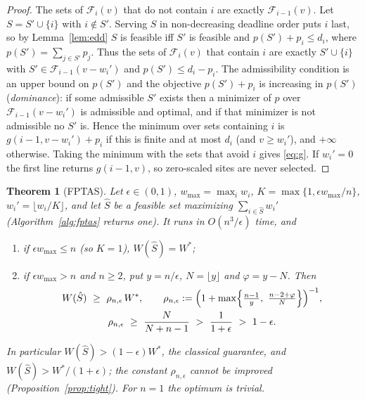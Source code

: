 \documentclass[pdflatex,sn-mathphys-ay]{sn-jnl}
\theoremstyle{thmstyleone}
\newtheorem{theorem}{Theorem}
\theoremstyle{thmstyletwo}
\theoremstyle{thmstylethree}
\begin{document}
\begin{proof}
The sets of $\mathcal F_i(v)$ that do not contain $i$ are exactly
$\mathcal F_{i-1}(v)$. Let $S=S'\cup\{i\}$ with $i\notin S'$. Serving $S$
in non-decreasing deadline order puts $i$ last, so by
Lemma~\ref{lem:edd} $S$ is feasible iff $S'$ is feasible and
$p(S')+p_i\le d_i$, where $p(S')=\sum_{j\in S'}p_j$. Thus the sets of
$\mathcal F_i(v)$ that contain $i$ are exactly $S'\cup\{i\}$ with
$S'\in\mathcal F_{i-1}(v-w_i')$ and $p(S')\le d_i-p_i$. The admissibility
condition is an upper bound on $p(S')$ and the objective $p(S')+p_i$ is
increasing in $p(S')$ (\emph{dominance}): if some admissible $S'$ exists
then a minimizer of $p$ over $\mathcal F_{i-1}(v-w_i')$ is admissible and
optimal, and if that minimizer is not admissible no $S'$ is. Hence the
minimum over sets containing $i$ is $g(i-1,v-w_i')+p_i$ if this is finite
and at most $d_i$ (and $v\ge w_i'$), and $+\infty$ otherwise. Taking the
minimum with the sets that avoid $i$ gives \eqref{eq:g}. If $w_i'=0$ the
first line returns $g(i-1,v)$, so zero-scaled sites are never selected.
\end{proof}

\begin{theorem}[FPTAS]\label{thm:fptas}
Let $\epsilon\in(0,1)$, $w_{\max}=\max_iw_i$, $K=\max\{1,\epsilon
w_{\max}/n\}$, $w_i'=\lfloor w_i/K\rfloor$, and let $\hat S$ be a feasible
set maximizing $\sum_{i\in\hat S}w_i'$ (Algorithm~\ref{alg:fptas} returns
one). It runs in $O(n^3/\epsilon)$ time, and
\begin{enumerate}
\item[(a)] if $\epsilon w_{\max}\le n$ (so $K=1$), $W(\hat S)=W^\ast$;
\item[(b)] if $\epsilon w_{\max}>n$ and $n\ge2$, put $y=n/\epsilon$,
$N=\lfloor y\rfloor$ and $\varphi=y-N$. Then
\begin{gather*}
W(\hat S)\ \ge\ \rho_{n,\epsilon}\,W^\ast,\qquad
\rho_{n,\epsilon}:=\Bigl(1+\max\Bigl\{\tfrac{n-1}{y},\ \tfrac{n-2+\varphi}{N}\Bigr\}\Bigr)^{-1},\\
\rho_{n,\epsilon}\ \ge\ \frac{N}{N+n-1}\ >\ \frac1{1+\epsilon}\ >\ 1-\epsilon .
\end{gather*}
\end{enumerate}
In particular $W(\hat S)>(1-\epsilon)W^\ast$, the classical guarantee,
and $W(\hat S)>W^\ast/(1+\epsilon)$; the constant $\rho_{n,\epsilon}$
cannot be improved (Proposition~\ref{prop:tight}). For $n=1$ the optimum
is trivial.
\end{theorem}
\end{document}
